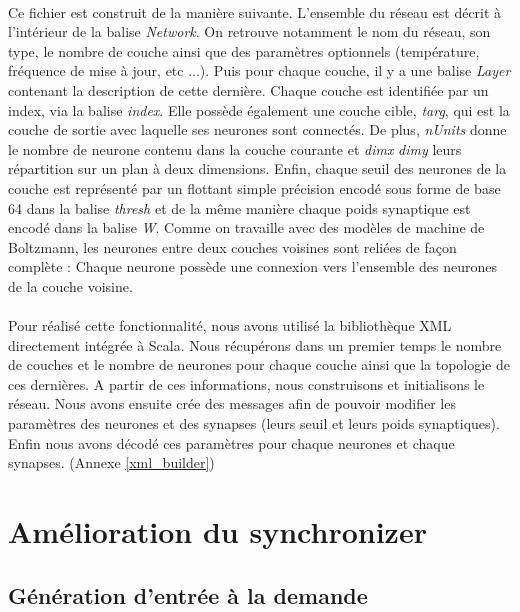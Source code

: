 \documentclass[a4paper,10pt]{article}
\begin{document}
\paragraph{}
Ce fichier est construit de la manière suivante. L'ensemble du réseau est décrit à l'intérieur de la balise \emph{Network}. On retrouve notamment le nom du réseau, son type, le nombre de couche ainsi que des paramètres optionnels (température, fréquence de mise à jour, etc ...). Puis pour chaque couche, il y a une balise \emph{Layer} contenant la description de cette dernière. Chaque couche est identifiée par un index, via la balise \emph{index}. Elle possède également une couche cible, \emph{targ}, qui est la couche de sortie avec laquelle ses neurones sont connectés. De plus, \emph{nUnits} donne le nombre de neurone contenu dans la couche courante et \emph{dimx} \emph{dimy} leurs répartition sur un plan à deux dimensions. Enfin, chaque seuil des neurones de la couche est représenté par un flottant simple précision encodé sous forme de base 64 dans la balise \emph{thresh} et de la même manière chaque poids synaptique est encodé dans la balise \emph{W}. Comme on travaille avec des modèles de machine de Boltzmann, les neurones entre deux couches voisines sont reliées de façon complète : Chaque neurone possède une connexion vers l'ensemble des neurones de la couche voisine.

\paragraph{}
Pour réalisé cette fonctionnalité, nous avons utilisé la bibliothèque XML directement intégrée à Scala. Nous récupérons dans un premier temps le nombre de couches et le nombre de neurones pour chaque couche ainsi que la topologie de ces dernières. A partir de ces informations, nous construisons et initialisons le réseau. Nous avons ensuite crée des messages afin de pouvoir modifier les paramètres des neurones et des synapses (leurs seuil et leurs poids synaptiques). Enfin nous avons décodé ces paramètres pour chaque neurones et chaque synapses. (Annexe \ref{xml_builder})

\section{Amélioration du synchronizer}

\subsection{Génération d'entrée à la demande}
\end{document}

